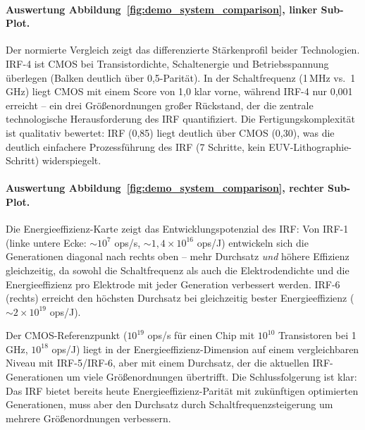 ﻿\documentclass[a4paper,12pt]{scrreprt}
\theoremstyle{definition}
\begin{document}
\paragraph{Auswertung Abbildung~\ref{fig:demo_system_comparison}, linker Sub-Plot.}
Der normierte Vergleich zeigt das differenzierte Stärkenprofil beider Technologien.
IRF-4 ist CMOS bei Transistordichte, Schaltenergie und Betriebsspannung
überlegen (Balken deutlich über 0,5-Parität). In der Schaltfrequenz (1\,MHz
vs.\ 1\,GHz) liegt CMOS mit einem Score von 1,0 klar vorne,
während IRF-4 nur 0,001 erreicht -- ein drei Größenordnungen großer Rückstand,
der die zentrale technologische Herausforderung des IRF quantifiziert.
Die Fertigungskomplexität ist qualitativ bewertet: IRF (0,85) liegt deutlich
über CMOS (0,30), was die deutlich einfachere Prozessführung des IRF
(7 Schritte, kein EUV-Lithographie-Schritt) widerspiegelt.

\paragraph{Auswertung Abbildung~\ref{fig:demo_system_comparison}, rechter Sub-Plot.}
Die Energieeffizienz-Karte zeigt das Entwicklungspotenzial des IRF: Von
IRF-1 (linke untere Ecke: $\sim 10^7$ ops/s, $\sim 1{,}4 \times 10^{16}$ ops/J)
entwickeln sich die Generationen diagonal nach rechts oben -- mehr Durchsatz
\emph{und} höhere Effizienz gleichzeitig, da sowohl die Schaltfrequenz als auch
die Elektrodendichte und die Energieeffizienz pro Elektrode mit jeder Generation
verbessert werden. IRF-6 (rechts) erreicht den höchsten Durchsatz bei
gleichzeitig bester Energieeffizienz ($\sim 2 \times 10^{19}$ ops/J).

Der CMOS-Referenzpunkt ($10^{19}$ ops/s für einen Chip mit $10^{10}$ Transistoren
bei 1\,GHz, $10^{18}$ ops/J) liegt in der Energieeffizienz-Dimension auf
einem vergleichbaren Niveau mit IRF-5/IRF-6, aber mit einem Durchsatz,
der die aktuellen IRF-Generationen um viele Größenordnungen übertrifft.
Die Schlussfolgerung ist klar: Das IRF bietet bereits heute Energieeffizienz-Parität
mit zukünftigen optimierten Generationen, muss aber den Durchsatz durch
Schaltfrequenzsteigerung um mehrere Größenordnungen verbessern.
\end{document}
